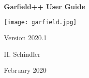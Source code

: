 \begin{titlepage}
  {
  \centering
  \sffamily
  \linespread{1.5}

  \vspace{3cm} 

  \huge{\textbf{Garfield++ User Guide}}

  \vspace{2cm}

  \texttt{[image: garfield.jpg]}

  \vspace{2cm}

  \large
  Version 2020.1 

  \vspace{2cm}
  \large
  H. Schindler

  \vfill

  February 2020

  }
\end{titlepage}
